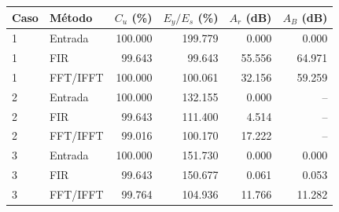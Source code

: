 \begin{tabular}{llrrrr}\toprule
Caso & Método & $C_u$ (\%) & $E_y/E_s$ (\%) & $A_r$ (dB) & $A_B$ (dB)\\\midrule
1 & Entrada & 100.000 & 199.779 & 0.000 & 0.000\\
1 & FIR & 99.643 & 99.643 & 55.556 & 64.971\\
1 & FFT/IFFT & 100.000 & 100.061 & 32.156 & 59.259\\
2 & Entrada & 100.000 & 132.155 & 0.000 & --\\
2 & FIR & 99.643 & 111.400 & 4.514 & --\\
2 & FFT/IFFT & 99.016 & 100.170 & 17.222 & --\\
3 & Entrada & 100.000 & 151.730 & 0.000 & 0.000\\
3 & FIR & 99.643 & 150.677 & 0.061 & 0.053\\
3 & FFT/IFFT & 99.764 & 104.936 & 11.766 & 11.282\\
\bottomrule\end{tabular}
